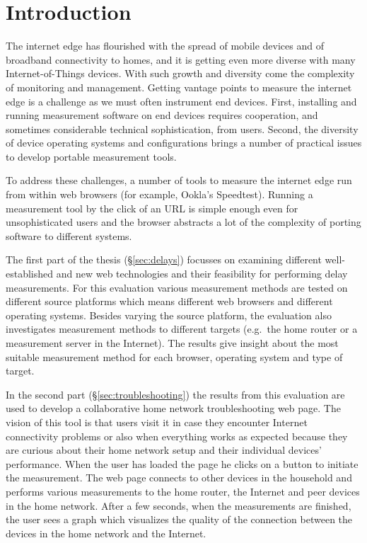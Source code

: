 \documentclass{sig-alternate-10pt}
\begin{document}




\section{Introduction}

The internet edge has flourished with the spread of mobile devices and of broadband connectivity to homes, and it is getting even more diverse with many Internet-of-Things devices. With such growth and diversity come the complexity of monitoring and management. Getting vantage points to measure the internet edge is a challenge as we must often instrument end devices. First, installing and running measurement software on end devices requires cooperation, and sometimes considerable technical sophistication, from users. Second, the diversity of device operating systems and configurations brings a number of practical issues to develop portable measurement tools.

To address these challenges, a number of tools to measure the internet edge run from within web browsers (for example, Ookla's Speedtest). Running a measurement tool by the  click of an URL is simple enough even for unsophisticated users and the browser abstracts  a lot of the complexity of  porting software to different systems.

The first part of the thesis (\S\ref{sec:delays}) focusses on examining different well-established and new web technologies and their feasibility for performing delay measurements. For this evaluation various measurement methods are tested on different source platforms which means different web browsers and different operating systems. Besides varying the source platform, the evaluation also investigates measurement methods to different targets (e.g.~the home router or a measurement server in the Internet). The results give insight about the most suitable measurement method for each browser, operating system and type of target.  

In the second part (\S\ref{sec:troubleshooting}) the results from this evaluation are used to develop a collaborative home network troubleshooting web page. The vision of this tool is that users visit it in case they encounter Internet connectivity problems or also when everything works as expected because they are curious about their home network setup and their individual devices' performance. When the user has loaded the page he clicks on a button to initiate the measurement. The web page connects to other devices in the household and performs various measurements to the home router, the Internet and peer devices in the home network. After a few seconds, when the measurements are finished, the user sees a graph which visualizes the quality of the connection between the devices in the home network and the Internet. 
\end{document}
